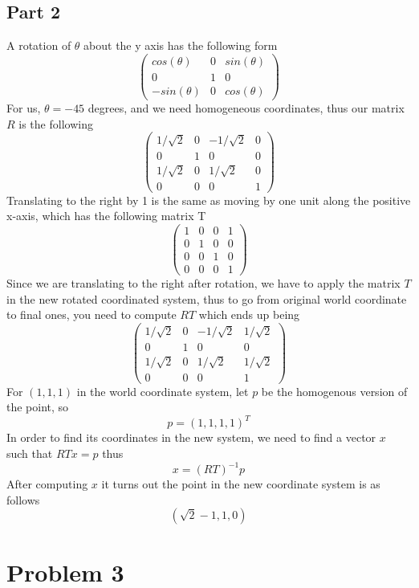 \documentclass[11pt,psfig]{article}
\begin{document}
\newpage

\subsection{Part 2}

A rotation of $\theta$ about the y axis has the following form
\[ \left( \begin{array}{ccc}
cos(\theta) & 0 & sin(\theta) \\
0 & 1 & 0 \\
-sin(\theta) & 0 & cos(\theta) \end{array} \right)\]
For us, $\theta=-45$ degrees, and we need homogeneous coordinates, thus our matrix $R$ is the following
\[ \left( \begin{array}{cccc}
1/\sqrt{2} & 0 & -1/\sqrt{2} & 0 \\
0 & 1 & 0 & 0\\
1/\sqrt{2} & 0 & 1/\sqrt{2} & 0 \\
0 & 0 & 0 & 1 \end{array} \right)\]
Translating to the right by 1 is the same as moving by one unit along the positive x-axis, which has the following matrix T 
\[ \left( \begin{array}{cccc}
1 & 0 & 0 & 1 \\
0 & 1 & 0 & 0\\
0 & 0 & 1 & 0 \\
0 & 0 & 0 & 1 \end{array} \right)\]
Since we are translating to the right after rotation, we have to apply the matrix $T$ in the new rotated coordinated system, thus to go from original world coordinate to final ones, you need to compute $RT$ which ends up being
\[ \left( \begin{array}{cccc}
1/\sqrt{2} & 0 & -1/\sqrt{2} & 1/\sqrt{2} \\
0 & 1 & 0 & 0\\
1/\sqrt{2} & 0 & 1/\sqrt{2} & 1/\sqrt{2} \\
0 & 0 & 0 & 1 \end{array} \right)\]
For $(1,1,1)$ in the world coordinate system, let $p$ be the homogenous version of the point, so 
\[
p=(1,1,1,1)^T
\]
In order to find its coordinates in the new system, we need to find a vector $x$ such that $RTx=p$ thus 
\[
x=(RT)^{-1} p
\] 
After computing $x$ it turns out the point in the new coordinate system is as follows
\[
(\sqrt{2} - 1, 1,0)
\]

\section{Problem 3}
\end{document}
